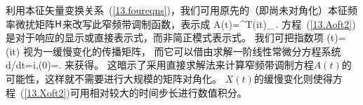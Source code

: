 {{{%
利用本征矢量变换关系~(\ref{13.foureqns})，我们可用原先的（即尚未对角化）本征频率微扰矩阵$\mbox{${\sf H}$}$来改写此窄频带调制函数，表示成
\eq \label{13.Aoft2}
A(t)=\ssu^{\rm T}\!\exp(i\ssH t)_{\,}\ssv.
\en
方程~(\ref{13.Aoft2})是对于响应的显示或直接表示式，而非简正模式表示式。
我们可把指数项
\eq \label{13.Xoft}
\ssX(t)=\exp(i\ssH t)
\en
视为一缓慢变化的传播矩阵，
%
%
而它可以借由求解一阶线性常微分方程系统
\eq \label{13.Xoft2}
d\hspace{0.2 mm}\ssX/\hspace{-0.2 mm}dt=i\ssH\ssX,\qquad\ssX(0)=\ssI.
\en
来获得。
这暗示了采用直接求解法来计算窄频带调制方程$A(t)$的可能性，这样就不需要进行大规模的矩阵对角化。 
$X(t)$的缓慢变化则使得方程~(\ref{13.Xoft2})可用相对较大的时间步长进行数值积分。

}}}

